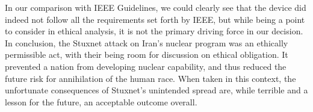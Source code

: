 In our comparison with IEEE Guidelines, we could clearly see that the device did indeed not follow all the requirements set forth by IEEE, but while being a point to consider in ethical analysis, it is not the primary driving force in our decision. In conclusion, the Stuxnet attack on Iran’s nuclear program was an ethically permissible act, with their being room for discussion on ethical obligation. It prevented a nation from developing nuclear capability, and thus reduced the future risk for annihilation of the human race. When taken in this context, the unfortunate consequences of Stuxnet's unintended spread are, while terrible and a lesson for the future, an acceptable outcome overall.



